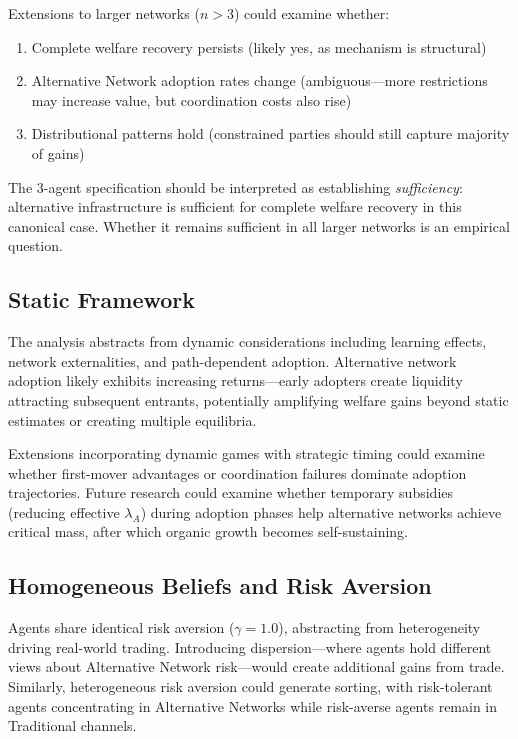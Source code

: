 Extensions to larger networks ($n > 3$) could examine whether:
\begin{enumerate}
    \item Complete welfare recovery persists (likely yes, as mechanism is structural)
    \item Alternative Network adoption rates change (ambiguous—more restrictions may increase value, but coordination costs also rise)
    \item Distributional patterns hold (constrained parties should still capture majority of gains)
\end{enumerate}

The 3-agent specification should be interpreted as establishing \emph{sufficiency}: alternative infrastructure is sufficient for complete welfare recovery in this canonical case. Whether it remains sufficient in all larger networks is an empirical question.

\subsection{Static Framework}

The analysis abstracts from dynamic considerations including learning effects, network externalities, and path-dependent adoption. Alternative network adoption likely exhibits increasing returns—early adopters create liquidity attracting subsequent entrants, potentially amplifying welfare gains beyond static estimates or creating multiple equilibria.

Extensions incorporating dynamic games with strategic timing could examine whether first-mover advantages or coordination failures dominate adoption trajectories. Future research could examine whether temporary subsidies (reducing effective $\lambda_A$) during adoption phases help alternative networks achieve critical mass, after which organic growth becomes self-sustaining.

\subsection{Homogeneous Beliefs and Risk Aversion}

Agents share identical risk aversion ($\gamma = 1.0$), abstracting from heterogeneity driving real-world trading. Introducing dispersion—where agents hold different views about Alternative Network risk—would create additional gains from trade. Similarly, heterogeneous risk aversion could generate sorting, with risk-tolerant agents concentrating in Alternative Networks while risk-averse agents remain in Traditional channels.

